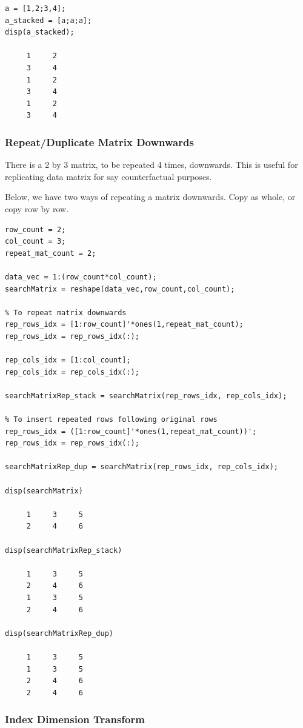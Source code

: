 \documentclass[
]{book}
\begin{document}
\begin{verbatim}
a = [1,2;3,4];
a_stacked = [a;a;a];
disp(a_stacked);

     1     2
     3     4
     1     2
     3     4
     1     2
     3     4
\end{verbatim}

\hypertarget{repeatduplicate-matrix-downwards}{%
\subsubsection{\texorpdfstring{\textbf{Repeat/Duplicate Matrix Downwards}}{Repeat/Duplicate Matrix Downwards}}\label{repeatduplicate-matrix-downwards}}

There is a 2 by 3 matrix, to be repeated 4 times, downwards. This is
useful for replicating data matrix for say counterfactual purposes.

Below, we have two ways of repeating a matrix downwards. Copy as whole,
or copy row by row.

\begin{verbatim}
row_count = 2;
col_count = 3;
repeat_mat_count = 2;

data_vec = 1:(row_count*col_count);
searchMatrix = reshape(data_vec,row_count,col_count);

% To repeat matrix downwards
rep_rows_idx = [1:row_count]'*ones(1,repeat_mat_count);
rep_rows_idx = rep_rows_idx(:);

rep_cols_idx = [1:col_count];
rep_cols_idx = rep_cols_idx(:);

searchMatrixRep_stack = searchMatrix(rep_rows_idx, rep_cols_idx);

% To insert repeated rows following original rows
rep_rows_idx = ([1:row_count]'*ones(1,repeat_mat_count))';
rep_rows_idx = rep_rows_idx(:);

searchMatrixRep_dup = searchMatrix(rep_rows_idx, rep_cols_idx);

disp(searchMatrix)

     1     3     5
     2     4     6

disp(searchMatrixRep_stack)

     1     3     5
     2     4     6
     1     3     5
     2     4     6

disp(searchMatrixRep_dup)

     1     3     5
     1     3     5
     2     4     6
     2     4     6
\end{verbatim}

\hypertarget{index-dimension-transform}{%
\subsubsection{Index Dimension Transform}\label{index-dimension-transform}}
\end{document}

